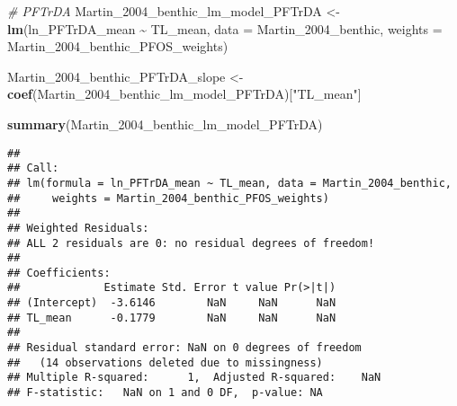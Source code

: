 \documentclass[
]{article}
\newenvironment{Shaded}{\begin{snugshade}}{\end{snugshade}}
\newcommand{\AttributeTok}[1]{\textcolor[rgb]{0.13,0.29,0.53}{#1}}
\newcommand{\CommentTok}[1]{\textcolor[rgb]{0.56,0.35,0.01}{\textit{#1}}}
\newcommand{\FunctionTok}[1]{\textcolor[rgb]{0.13,0.29,0.53}{\textbf{#1}}}
\newcommand{\NormalTok}[1]{#1}
\newcommand{\OtherTok}[1]{\textcolor[rgb]{0.56,0.35,0.01}{#1}}
\newcommand{\SpecialCharTok}[1]{\textcolor[rgb]{0.81,0.36,0.00}{\textbf{#1}}}
\newcommand{\StringTok}[1]{\textcolor[rgb]{0.31,0.60,0.02}{#1}}
\begin{document}
\begin{Shaded}
\begin{Highlighting}[]
\CommentTok{\# PFTrDA}
\NormalTok{Martin\_2004\_benthic\_lm\_model\_PFTrDA }\OtherTok{\textless{}{-}} \FunctionTok{lm}\NormalTok{(ln\_PFTrDA\_mean }\SpecialCharTok{\textasciitilde{}}\NormalTok{ TL\_mean, }
                                        \AttributeTok{data =}\NormalTok{ Martin\_2004\_benthic,}
                                        \AttributeTok{weights =}\NormalTok{ Martin\_2004\_benthic\_PFOS\_weights)}

\NormalTok{Martin\_2004\_benthic\_PFTrDA\_slope }\OtherTok{\textless{}{-}} \FunctionTok{coef}\NormalTok{(Martin\_2004\_benthic\_lm\_model\_PFTrDA)[}\StringTok{"TL\_mean"}\NormalTok{]}

\FunctionTok{summary}\NormalTok{(Martin\_2004\_benthic\_lm\_model\_PFTrDA)}
\end{Highlighting}
\end{Shaded}

\begin{verbatim}
## 
## Call:
## lm(formula = ln_PFTrDA_mean ~ TL_mean, data = Martin_2004_benthic, 
##     weights = Martin_2004_benthic_PFOS_weights)
## 
## Weighted Residuals:
## ALL 2 residuals are 0: no residual degrees of freedom!
## 
## Coefficients:
##             Estimate Std. Error t value Pr(>|t|)
## (Intercept)  -3.6146        NaN     NaN      NaN
## TL_mean      -0.1779        NaN     NaN      NaN
## 
## Residual standard error: NaN on 0 degrees of freedom
##   (14 observations deleted due to missingness)
## Multiple R-squared:      1,  Adjusted R-squared:    NaN 
## F-statistic:   NaN on 1 and 0 DF,  p-value: NA
\end{verbatim}
\end{document}
